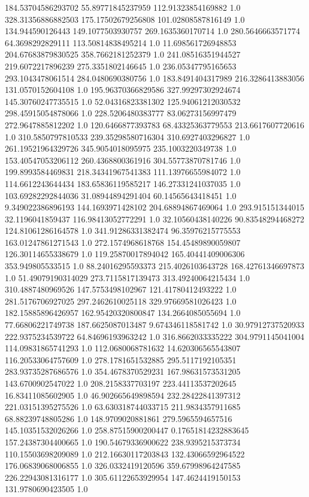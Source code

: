 184.53704586293702	55.89771845237959	112.91323854169882	1.0
328.31356886882503	175.17502679256808	101.02808587816149	1.0
134.944590126443	149.1077503930757	269.1635360170714	1.0
280.5646663571774	64.3698292829111	113.50814838495214	1.0
11.698561726948853	204.67683879830525	358.7662181252379	1.0
241.08516351944527	219.6072217896239	275.3351802146645	1.0
236.05347795165653	293.1043478061514	284.0480690380756	1.0
183.8491404317989	216.3286413883056	131.0570152604108	1.0
195.96370366829586	327.99297302924674	145.30760247735515	1.0
52.04316823381302	125.94061212030532	298.45915054878066	1.0
228.5206480383777	83.06273156997479	272.9647885812202	1.0
120.6466877393783	68.43325363779553	213.6617607720616	1.0
310.5850797810533	239.35298580716304	310.6927403296827	1.0
261.19521964329726	345.9054018095975	235.1003220349738	1.0
153.40547053206112	260.4368800361916	304.55773870781746	1.0
199.8993584469831	218.34341967541383	111.13976655984072	1.0
114.6612243644434	183.65836119585217	146.27331241037035	1.0
103.69282292844036	31.08944894291404	60.14565643418451	1.0
9.349022386896193	144.1693971428102	204.68894867469064	1.0
293.915151344015	32.1196041859437	116.98413052772291	1.0
32.10560438140226	90.83548294468272	124.81061286164578	1.0
341.91286331382474	96.35976215775553	163.01247861271543	1.0
272.1574968618768	154.45489890059807	126.30114655338679	1.0
119.25870017894042	165.40441409006306	353.949805533515	1.0
88.24016295593373	215.4026103643728	168.42761346697873	1.0
51.49079190314029	273.7115817139473	313.49240064215434	1.0
310.4887480969526	147.5753498102967	121.41780412493222	1.0
281.5176706927025	297.2462610025118	329.97669581026423	1.0
182.15885896426957	162.95420320800847	134.2664085055694	1.0
77.66806221749738	187.6625087013487	9.674346118581742	1.0
30.97912737520933	222.9375234539722	64.84696193963242	1.0
316.8662033335222	304.9791145041004	114.09831865741293	1.0
112.0680068781632	14.620306565543807	116.20533064757609	1.0
278.1781651532885	295.5117192105351	283.93735287686576	1.0
354.4678370529231	167.98631573531205	143.6700902547022	1.0
208.2158337703197	223.44113537202645	16.83411085602905	1.0
46.902665649898594	232.28422841397312	221.03151395275526	1.0
63.630318744033715	211.9834357911685	68.88239748805286	1.0
148.9709020881861	279.5965594657516	145.10351532026266	1.0
258.87515900200447	0.17651814232883645	157.24387304400665	1.0
190.54679336900622	238.9395215373734	110.15503698209089	1.0
212.16630117203843	132.43066592964522	176.06839068006855	1.0
326.0332419120596	359.67998964247585	226.22943081316177	1.0
305.61122653929954	147.4624419150153	131.9780690423505	1.0
